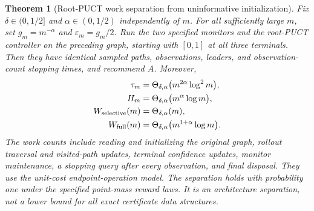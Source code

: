 \documentclass{article}
\theoremstyle{plain}
\newtheorem{theorem}{Theorem}[section]
\theoremstyle{definition}
\begin{document}
\begin{theorem}[Root-PUCT work separation from uninformative initialization]
\label{thm:v2separation}
Fix $\delta\in(0,1/2]$ and $\alpha\in(0,1/2)$ independently of $m$.
For all sufficiently large $m$, set $g_m=m^{-\alpha}$ and
$\varepsilon_m=g_m/2$. Run the two specified monitors and the root-PUCT
controller on the preceding graph, starting with $[0,1]$ at all three
terminals. Then they have identical sampled paths, observations, leaders,
and observation-count stopping times, and recommend $A$. Moreover,
\begin{align}
 \tau_m&=\Theta_{\delta,\alpha}
                 \big(m^{2\alpha}\log^2 m\big),
 \label{eq:v2taum}\\
 H_m&=\Theta_{\delta,\alpha}
                 \big(m^\alpha\log m\big),
 \label{eq:v2hm}\\
 W_{\rm selective}(m)&=\Theta_{\delta,\alpha}(m),
 \label{eq:v2wselective}\\
 W_{\rm full}(m)&=\Theta_{\delta,\alpha}
                 \big(m^{1+\alpha}\log m\big).
 \label{eq:v2wfull}
\end{align}
The work counts include reading and initializing the original graph,
rollout traversal and visited-path updates, terminal confidence updates,
monitor maintenance, a stopping query after every observation, and final
disposal. They use the unit-cost endpoint-operation model. The separation
holds with probability one under the specified point-mass reward laws.
It is an architecture separation, not a lower bound for all exact
certificate data structures.
\end{theorem}
\end{document}

